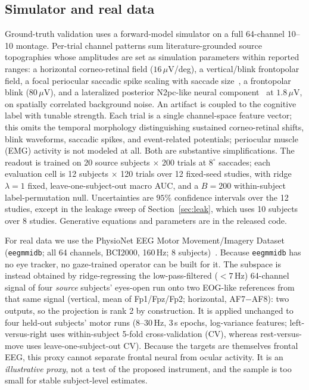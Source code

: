 \documentclass[conference]{IEEEtran}
\begin{document}
\subsection{Simulator and real data}

Ground-truth validation uses a forward-model simulator on a full 64-channel 10--10 montage.
Per-trial channel patterns sum literature-grounded source topographies whose amplitudes are set
as simulation parameters within reported ranges: a horizontal corneo-retinal field
($16\,\mu$V/deg), a vertical/blink frontopolar field, a focal periocular saccadic spike scaling
with saccade size~\cite{keren2010saccadic}, a frontopolar blink ($80\,\mu$V), and a lateralized
posterior N2pc-like neural component~\cite{luck1994n2pc} at $1.8\,\mu$V, on spatially correlated
background noise. An artifact
is coupled to the cognitive label with tunable strength. Each trial is a single channel-space
feature vector; this omits the temporal morphology distinguishing sustained corneo-retinal
shifts, blink waveforms, saccadic spikes, and event-related potentials; periocular muscle (EMG)
activity is not modeled at all. Both are substantive simplifications. The readout is trained on 20 source subjects $\times$ 200 trials at $8^\circ$
saccades; each evaluation cell is 12 subjects $\times$ 120 trials over 12 fixed-seed studies,
with ridge $\lambda{=}1$ fixed, leave-one-subject-out macro AUC, and a $B{=}200$ within-subject
label-permutation null. Uncertainties are $95\%$ confidence intervals over the 12 studies, except
in the leakage sweep of Section~\ref{sec:leak}, which uses 10 subjects over 8 studies.
Generative equations and parameters are in the released code.

For real data we use the PhysioNet EEG Motor Movement/Imagery Dataset (\texttt{eegmmidb};
all 64 channels, BCI2000, 160\,Hz; 8 subjects)~\cite{schalk2009eegmmidb,schalk2004bci2000,pollard2026physionet}. Because \texttt{eegmmidb} has no
eye tracker, no gaze-trained operator can be built for it. The subspace is instead obtained by
ridge-regressing the low-pass-filtered ($<7$\,Hz) 64-channel signal of four \emph{source} subjects'
eyes-open run onto two EOG-like references from that same signal (vertical, mean of Fp1/Fpz/Fp2;
horizontal, AF7$-$AF8): two outputs, so the projection is rank 2 by construction. It is applied
unchanged to four held-out subjects' motor runs ($8$--$30$\,Hz, 3\,s epochs, log-variance
features; left-versus-right uses within-subject 5-fold cross-validation (CV), whereas
rest-versus-move uses leave-one-subject-out CV). Because the targets are themselves frontal EEG, this proxy cannot separate
frontal neural from ocular activity. It is an \emph{illustrative
proxy}, not a test of the proposed instrument, and the sample is too
small for stable subject-level estimates.
\end{document}
